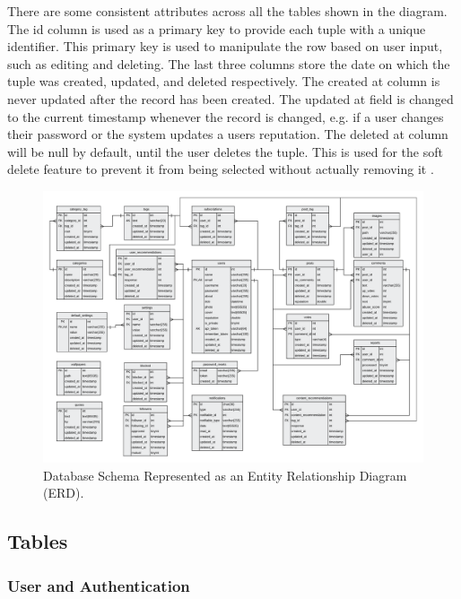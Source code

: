 There are some consistent attributes across all the tables shown in the diagram. The id column is used as a primary key to provide each tuple with a unique identifier. This primary key is used to manipulate the row based on user input, such as editing and deleting. The last three columns store the date on which the tuple was created, updated, and deleted respectively. The created at column is never updated after the record has been created. The updated at field is changed to the current timestamp whenever the record is changed, e.g. if a user changes their password or the system updates a users reputation. The deleted at column will be null by default, until the user deletes the tuple. This is used for the soft delete feature to prevent it from being selected without actually removing it \cite{PCMEncyclopedia:SoftDelete}.

\begin{figure}[H]
  \centering
  \includegraphics[width=1.0\textwidth]{Images/Design/Database/ERD}
  \caption{Database Schema Represented as an Entity Relationship Diagram (ERD).} \label{fig:Database_ERD}
\end{figure}

\subsection{Tables}
\label{SubSection:Database_Tables}

\subsubsection{User and Authentication}

